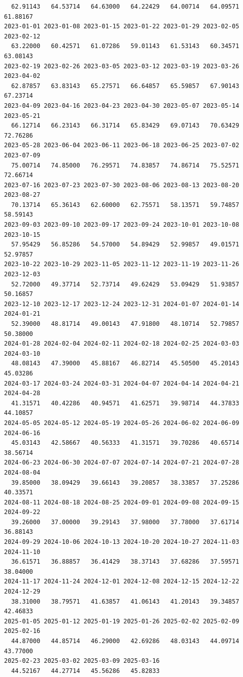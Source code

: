 \documentclass[
  letterpaper,
  DIV=11,
  numbers=noendperiod]{scrartcl}
\begin{document}
\begin{verbatim}
  62.91143   64.53714   64.63000   64.22429   64.00714   64.09571   61.88167 
2023-01-01 2023-01-08 2023-01-15 2023-01-22 2023-01-29 2023-02-05 2023-02-12 
  63.22000   60.42571   61.07286   59.01143   61.53143   60.34571   63.08143 
2023-02-19 2023-02-26 2023-03-05 2023-03-12 2023-03-19 2023-03-26 2023-04-02 
  62.87857   63.83143   65.27571   66.64857   65.59857   67.90143   67.23714 
2023-04-09 2023-04-16 2023-04-23 2023-04-30 2023-05-07 2023-05-14 2023-05-21 
  66.12714   66.23143   66.31714   65.83429   69.07143   70.63429   72.76286 
2023-05-28 2023-06-04 2023-06-11 2023-06-18 2023-06-25 2023-07-02 2023-07-09 
  75.00714   74.85000   76.29571   74.83857   74.86714   75.52571   72.66714 
2023-07-16 2023-07-23 2023-07-30 2023-08-06 2023-08-13 2023-08-20 2023-08-27 
  70.13714   65.36143   62.60000   62.75571   58.13571   59.74857   58.59143 
2023-09-03 2023-09-10 2023-09-17 2023-09-24 2023-10-01 2023-10-08 2023-10-15 
  57.95429   56.85286   54.57000   54.89429   52.99857   49.01571   52.97857 
2023-10-22 2023-10-29 2023-11-05 2023-11-12 2023-11-19 2023-11-26 2023-12-03 
  52.72000   49.37714   52.73714   49.62429   53.09429   51.93857   50.16857 
2023-12-10 2023-12-17 2023-12-24 2023-12-31 2024-01-07 2024-01-14 2024-01-21 
  52.39000   48.81714   49.00143   47.91800   48.10714   52.79857   50.38000 
2024-01-28 2024-02-04 2024-02-11 2024-02-18 2024-02-25 2024-03-03 2024-03-10 
  48.08143   47.39000   45.88167   46.82714   45.50500   45.20143   45.03286 
2024-03-17 2024-03-24 2024-03-31 2024-04-07 2024-04-14 2024-04-21 2024-04-28 
  41.31571   40.42286   40.94571   41.62571   39.98714   44.37833   44.10857 
2024-05-05 2024-05-12 2024-05-19 2024-05-26 2024-06-02 2024-06-09 2024-06-16 
  45.03143   42.58667   40.56333   41.31571   39.70286   40.65714   38.56714 
2024-06-23 2024-06-30 2024-07-07 2024-07-14 2024-07-21 2024-07-28 2024-08-04 
  39.85000   38.09429   39.66143   39.20857   38.33857   37.25286   40.33571 
2024-08-11 2024-08-18 2024-08-25 2024-09-01 2024-09-08 2024-09-15 2024-09-22 
  39.26000   37.00000   39.29143   37.98000   37.78000   37.61714   36.88143 
2024-09-29 2024-10-06 2024-10-13 2024-10-20 2024-10-27 2024-11-03 2024-11-10 
  36.61571   36.88857   36.41429   38.37143   37.68286   37.59571   38.04000 
2024-11-17 2024-11-24 2024-12-01 2024-12-08 2024-12-15 2024-12-22 2024-12-29 
  38.31000   38.79571   41.63857   41.06143   41.20143   39.34857   42.46833 
2025-01-05 2025-01-12 2025-01-19 2025-01-26 2025-02-02 2025-02-09 2025-02-16 
  44.87000   44.85714   46.29000   42.69286   48.03143   44.09714   43.77000 
2025-02-23 2025-03-02 2025-03-09 2025-03-16 
  44.52167   44.27714   45.56286   45.82833 
\end{verbatim}
\end{document}
